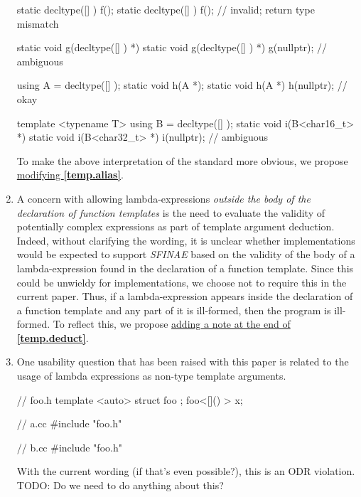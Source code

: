 \documentclass{wg21}
\begin{document}
\begin{enumerate}
\begin{cpp}
static decltype([] { }) f();
static decltype([] { }) f(); // invalid; return type mismatch

static void g(decltype([] { }) *) { }
static void g(decltype([] { }) *) { }
g(nullptr); // ambiguous

using A = decltype([] { });
static void h(A *);
static void h(A *) { }
h(nullptr); // okay

template <typename T>
using B = decltype([] { });
static void i(B<char16_t> *) { }
static void i(B<char32_t> *) { }
i(nullptr); // ambiguous
\end{cpp}

  To make the above interpretation of the standard more obvious, we propose
  \hyperref[wording.redeclarations]{modifying \textbf{[temp.alias]}}.


  \item \label{discussion.sfinae}
  A concern with allowing lambda-expressions \textit{outside the body of
  the declaration of function templates} is the need to evaluate the validity
  of potentially complex expressions as part of template argument deduction.
  Indeed, without clarifying the wording, it is unclear whether implementations
  would be expected to support \textit{SFINAE} based on the validity of
  the body of a lambda-expression found in the declaration of a function
  template. Since this could be unwieldy for implementations, we choose not
  to require this in the current paper. Thus, if a lambda-expression appears
  inside the declaration of a function template and any part of it is ill-formed,
  then the program is ill-formed. To reflect this, we propose
  \hyperref[wording.sfinae]{adding a note at the end of \textbf{[temp.deduct]}}.

  \item \label{discussion.nontype}
  One usability question that has been raised with this paper is related
  to the usage of lambda expressions as non-type template arguments.

  \begin{cpp}
  // foo.h
  template <auto> struct foo { };
  foo<[]() {}> x;

  // a.cc
  #include "foo.h"

  // b.cc
  #include "foo.h"
  \end{cpp}

  With the current wording (if that's even possible?), this is an ODR violation.
  TODO: Do we need to do anything about this?

\end{enumerate}
\end{document}
